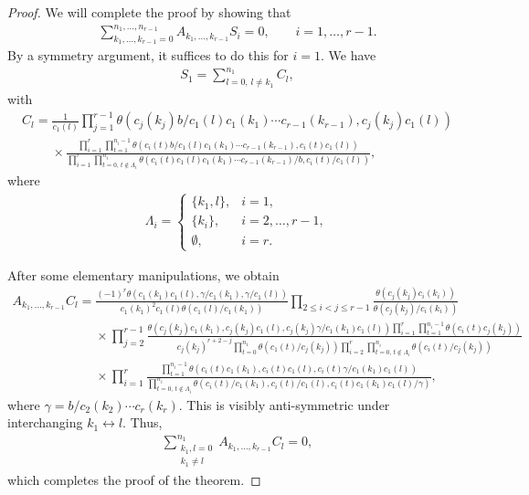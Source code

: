 \documentclass[pdftex]{sigma}%
\numberwithin{equation}{section}
\begin{document}
\begin{proof}
We will complete the proof by showing that
\begin{gather*}\sum_{k_1,\dots,k_{r-1}=0}^{n_1,\dots,n_{r-1}}A_{k_1,\dots,k_{r-1}}
S_i=0,\qquad i=1,\dots,r-1.\end{gather*}
 By a symmetry argument, it suffices to do this for $i=1$.
We have
\begin{gather*}S_1=\sum_{l=0,\,l\neq k_1}^{n_1}C_l, \end{gather*}
with
\begin{gather*}
C_l=
\frac{1}{c_1(l)}
\prod\limits_{j=1}^{r-1}\theta(c_j(k_j)b/c_1(l)c_1(k_1)\dotsm
 c_{r-1}(k_{r-1}),
 c_j(k_j)c_1(l))
 \\ \phantom{C_l=}{}
\times\frac{\prod\limits_{i=1}^r\prod\limits_{t=1}^{n_i-1}\theta
(c_i(t)b/c_1(l)c_1(k_1)\dotsm
 c_{r-1}(k_{r-1}),c_i(t)c_1(l))}
{\prod\limits_{i=1}^{r}\prod\limits_{t=0,\,t\notin \Lambda_i}^{n_i}
\theta(c_i(t)c_1(l) c_1(k_1)\dotsm
 c_{r-1}(k_{r-1})/b,c_i(t)/c_1(l))},
\end{gather*}
where
\begin{gather*}
\Lambda_i=
\begin{cases}\{k_1,l\}, & i=1,\\ \{k_i\}, &
 i=2,\dots,r-1,\\ \emptyset, & i=r.
\end{cases}
\end{gather*}

After some elementary manipulations, we obtain
\begin{gather*}
A_{k_1,\dots,k_{r-1}}C_{l}=
\frac{(-1)^r\theta(c_1(k_1)c_1(l),\gamma/c_1(k_1),
\gamma/c_1(l))}{c_1(k_1)^2c_1(l) \theta(c_1(l)/c_1(k_1))}
\prod\limits_{2\leq i<j\leq
 r-1}\frac{\theta(c_j(k_j)c_i(k_i))}{\theta(c_j(k_j)/c_i(k_i))}
 \\ \phantom{A_{k_1,\dots,k_{r-1}}C_{l}=}{}
\times\prod\limits_{j=2}^{r-1}\frac{\theta(c_j(k_j)c_1(k_1),c_j(k_j)c_1(l),c_j(k_j)\gamma/
c_1(k_1)c_1(l))\prod\limits_{i=1}^r\prod\limits_{t=1}^{n_i-1}
\theta(c_i(t)c_j(k_j))}{c_j(k_j)^{r+2-j}
\prod\limits_{t=0}^{n_1}\theta(c_1(t)/c_j(k_j))\prod\limits_{i=2}^{r}\prod\limits_{t=0,\,t\notin
 \Lambda_i}^{n_i}\theta(c_i(t)/c_j(k_j))}
 \\ \phantom{A_{k_1,\dots,k_{r-1}}C_{l}=}{}
\times\prod\limits_{i=1}^r\frac{\prod\limits_{t=1}^{n_i-1}
\theta(c_i(t)c_1(k_1),c_i(t)c_1(l),c_i(t)\gamma/c_1(k_1)c_1(l))}
{\prod\limits_{t=0,\,t\notin \Lambda_i}^{n_i}
\theta(c_i(t)/c_1(k_1),c_i(t)/c_1(l),c_i(t)c_1(k_1)c_1(l)/\gamma)},
\end{gather*}
where $\gamma=b/c_2(k_2)\dotsm c_r(k_r)$.
This is visibly anti-symmetric under interchanging
$k_1\leftrightarrow l$. Thus,
\begin{gather*}
\sum_{\substack{k_1,l=0\\k_1\neq l}}^{n_1}A_{k_1,\dots,k_{r-1}}C_{l}=0,
\end{gather*}
which completes the proof of the theorem.
\end{proof}
\end{document}
